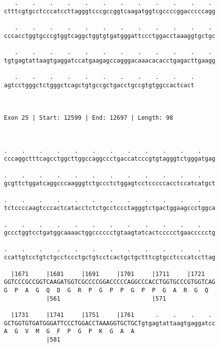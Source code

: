 \documentclass{article}
\begin{document}
\begin{Verbatim}
   .    .    .    .    .    .    .    .    .    .    .    . 
ctttcgtgcctcccatccttagggtcccgccggtcaagatggtcgccccggacccccagg
                                                            
   .    .    .    .    .    .    .    .    .    .    .    . 
cccacctggtgcccgtggtcaggctggtgtgatgggattccctggacctaaaggtgctgc
                                                            
   .    .    .    .    .    .    .    .    .    .    .    . 
tgtgagtattaagtgaggatccatgaagagccagggacaaacacacctgagacttgaagg
                                                            
   .    .    .    .    .    .    .    .    .    .    .
agtcctgggctctgggctcagctgtgccgctgacctgccgtgtggccactcact
                                                      
                                                      
 
Exon 25 | Start: 12599 | End: 12697 | Length: 98



.    .    .    .    .    .    .    .    .    .    .    .    
cccaggctttcagcctggcttggccaggccctgaccatcccgtgtagggtctgggatgag
                                                            
.    .    .    .    .    .    .    .    .    .    .    .    
gcgttctggatcaggcccaagggtctgccctctggagtcctcccccacctccatcatgct
                                                            
.    .    .    .    .    .    .    .    .    .    .    .    
tctccccaagtcccactcatacctctctgcctccctagggtctgactggaagccctggca
                                                            
.    .    .    .    .    .    .    .    .    .    .    .    
gccctggtcctgatggcaaaactggcccccctgtaagtatcactccccctgaaccccctg
                                                            
.    .    .    .    .    .    .    .    .    .    .    .    
ccattgtcctgtctgcctccctgctgtcctcactgctgctttcgtgcctcccatccttag
                                                            
  |1671     |1681     |1691     |1701     |1711     |1721   
GGTCCCGCCGGTCAAGATGGTCGCCCCGGACCCCCAGGCCCACCTGGTGCCCGTGGTCAG
G  P  A  G  Q  D  G  R  P  G  P  P  G  P  P  G  A  R  G  Q  
            |561                          |571              
  
  |1731     |1741     |1751     |1761      .    .    .    . 
GCTGGTGTGATGGGATTCCCTGGACCTAAAGGTGCTGCTgtgagtattaagtgaggatcc
A  G  V  M  G  F  P  G  P  K  G  A  A                       
            |581                                            
  

\end{Verbatim}
\end{document}
